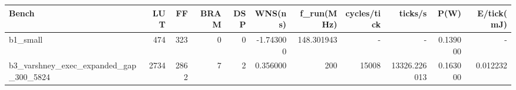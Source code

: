 \begin{tabular}{lrrrrrrrrrr}
\hline
Bench & LUT & FF & BRAM & DSP & WNS(ns) & f\_run(MHz) & cycles/tick & ticks/s & P(W) & E/tick(mJ) \\
\hline
b1\_small & 474 & 323 & 0 & 0 & -1.743000 & 148.301943 & - & - & 0.139000 & - \\
b3\_varshney\_exec\_expanded\_gap\_300\_5824 & 2734 & 2862 & 7 & 2 & 0.356000 & 200 & 15008 & 13326.226013 & 0.163000 & 0.012232 \\
\hline
\end{tabular}
